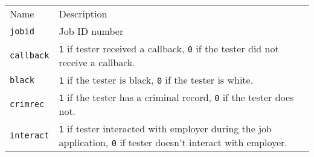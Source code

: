 \documentclass[]{article}
\begin{document}
\begin{longtable}[c]{@{}ll@{}}
\toprule\addlinespace
\begin{minipage}[b]{0.19\columnwidth}\raggedright
Name
\end{minipage} & \begin{minipage}[b]{0.75\columnwidth}\raggedright
Description
\end{minipage}
\\\addlinespace
\midrule\endhead
\begin{minipage}[t]{0.19\columnwidth}\raggedright
\texttt{jobid}
\end{minipage} & \begin{minipage}[t]{0.75\columnwidth}\raggedright
Job ID number
\end{minipage}
\\\addlinespace
\begin{minipage}[t]{0.19\columnwidth}\raggedright
\texttt{callback}
\end{minipage} & \begin{minipage}[t]{0.75\columnwidth}\raggedright
\texttt{1} if tester received a callback, \texttt{0} if the tester did
not receive a callback.
\end{minipage}
\\\addlinespace
\begin{minipage}[t]{0.19\columnwidth}\raggedright
\texttt{black}
\end{minipage} & \begin{minipage}[t]{0.75\columnwidth}\raggedright
\texttt{1} if the tester is black, \texttt{0} if the tester is white.
\end{minipage}
\\\addlinespace
\begin{minipage}[t]{0.19\columnwidth}\raggedright
\texttt{crimrec}
\end{minipage} & \begin{minipage}[t]{0.75\columnwidth}\raggedright
\texttt{1} if the tester has a criminal record, \texttt{0} if the tester
does not.
\end{minipage}
\\\addlinespace
\begin{minipage}[t]{0.19\columnwidth}\raggedright
\texttt{interact}
\end{minipage} & \begin{minipage}[t]{0.75\columnwidth}\raggedright
\texttt{1} if tester interacted with employer during the job
application, \texttt{0} if tester doesn't interact with employer.
\end{minipage}

\end{longtable}
\end{document}
